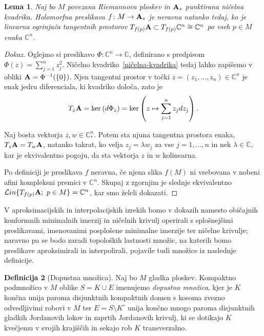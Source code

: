 \documentclass[12pt,a4paper,twoside]{article}
\theoremstyle{definition} %
\newtheorem{definicija}{Definicija}[section]
\newenvironment{dokaz}[1][Dokaz]{\begin{proof}[#1]}{\end{proof}}
\theoremstyle{plain} %
\newtheorem{lema}[definicija]{Lema}
\numberwithin{equation}{section}  %
\newcommand{\C}{\mathbb C}
\begin{document}
\begin{lema} \label{lema:neravna f}
Naj bo $M$ povezana Riemannova ploskev in $\textbf{\textup{A}}_{*}$ punktirana ničelna kvadrika.
Holomorfna preslikava $f \colon M \to \textbf{\textup{A}}_{*}$ je neravna natanko tedaj, ko je linearna ogrinjača tangentnih prostorov 
$T_{f(p)} \textbf{\textup{A}} \subset T_{f(p)} \C^{n} \cong \mathbb{C}^{n}$ po vseh $p \in M$ enaka $\C^{n}$.
\end{lema}

\begin{dokaz}
Oglejmo si preslikavo 
$\Phi \colon \C^{n} \to \C$, definirano s predpisom $\Phi(z) = \sum_{j=1}^{n} z_{j}^{2}$.
Ničelno kvadriko~\eqref{ničelna-kvadrika} tedaj lahko zapišemo v obliki $\textbf{\textup{A}} = \Phi^{-1}( \{0\} )$.
Njen tangentni prostor v točki $z = (z_{1}, \dots , z_{n}) \in \C^{n}$ je enak jedru diferenciala, ki kvadriko določa, zato je
\begin{gather*}
T_{z} \textbf{\textup{A}} = \ker \left(d \Phi_{z} \right) = \ker \left(z \mapsto \sum_{j=1}^{n} z_{j} dz_{j} \right).
\end{gather*}

Naj bosta vektorja $z, w \in \C_{*}^{n}$. Potem sta njuna tangentna prostora enaka, $ T_{z} \textbf{\textup{A}} = T_{w} \textbf{\textup{A}} $, natanko takrat, ko velja $z_{j} = \lambda w_{j}$ za vse $j = 1, \dots , n$ in nek $\lambda \in \C$, kar je ekvivalentno pogoju, da sta vektorja $z$ in $w$ kolinearna.

Po definiciji je preslikava $f$ neravna, če njena slika $f(M)$ ni vsebovana v nobeni afini kompleksni premici v $\C^{n}$. Skupaj z zgornjim je slednje ekvivalentno 
$ \mathcal{L}in \{T_{f(p)} \textbf{\textup{A}} ; \ p \in M \} = \C^{n}$, kar smo želeli dokazati.
\end{dokaz}

V aproksimacijskih in interpolacijskih izrekih bomo v dokazih namesto običajnih konformnih minimalnih imerzij in ničelnih krivulj operirali s splošnejšimi preslikavami, imenovanimi posplošene minimalne imerzije ter ničelne krivulje; naravno pa se bodo zaradi topoloških lastnosti množic, na katerih bomo preslikave aproksimirali in interpolirali, pojavile tudi množice iz naslednje definicije.

\begin{definicija} [Dopustna množica] \label{def:dopustna-mnozica}
Naj bo $M$ gladka ploskev. Kompaktno podmnožico v $M$ oblike $S = K \cup E$ imenujemo \emph{dopustna množica}, kjer je $K$ končna unija paroma disjunktnih kompaktnih domen s kosoma zvezno odvedljivimi robovi v $M$ ter $E = S \setminus K^\circ$ unija končno mnogo paroma disjunktnih gladkih Jordanovih lokov in zaprtih Jordanovih krivulj, ki se dotikajo $K$ kvečjemu v svojih krajiščih in sekajo rob $K$ transverzalno.
\end{definicija}
\end{document}

